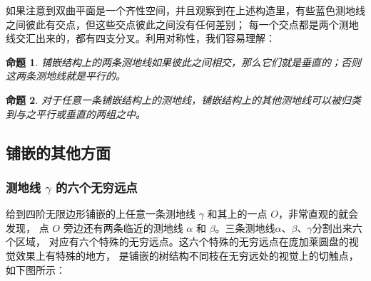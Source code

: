 \documentclass[a4paper,12pt]{article}
\newtheorem{proposition}{命题}
\begin{document}
如果注意到双曲平面是一个齐性空间，并且观察到在上述构造里，有些蓝色测地线之间彼此有交点，但这些交点彼此之间没有任何差别；
每一个交点都是两个测地线交汇出来的，都有四支分叉。利用对称性，我们容易理解：

\begin{proposition}
\label{A}
铺嵌结构上的两条测地线如果彼此之间相交，那么它们就是垂直的；否则这两条测地线就是平行的。
\end{proposition}

\begin{proposition}
\label{B}
对于任意一条铺嵌结构上的测地线，铺嵌结构上的其他测地线可以被归类到与之平行或垂直的两组之中。
\end{proposition}

\newpage

\subsection{铺嵌的其他方面}

\subsubsection{测地线 $\gamma$ 的六个无穷远点}

给到四阶无限边形铺嵌的上任意一条测地线 $\gamma$ 和其上的一点 $O$，非常直观的就会发现，
点 $O$ 旁边还有两条临近的测地线 $\alpha$ 和 $\beta$。三条测地线$\alpha$、$\beta$、$\gamma$分割出来六个区域，
对应有六个特殊的无穷远点。这六个特殊的无穷远点在庞加莱圆盘的视觉效果上有特殊的地方，
是铺嵌的树结构不同枝在无穷远处的视觉上的切触点，如下图所示：
\end{document}
